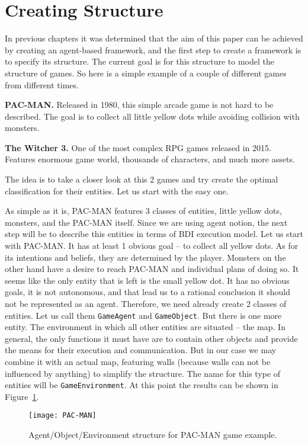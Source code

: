 \section{Creating Structure}
In previous chapters it was determined that the aim of this paper can be achieved by creating an agent-based framework, and the first step to create a framework is to specify its structure. The current goal is for this structure to model the structure of games. So here is a simple example of a couple of different games from different times.
\par
\textbf{PAC-MAN.} Released in 1980, this simple arcade game is not hard to be described.
The goal is to collect all little yellow dots while avoiding collision with monsters.
\par
\textbf{The Witcher 3.} One of the most complex RPG games released in 2015. Features enormous game world, thousands of characters, and much more assets.
\par
The idea is to take a closer look at this 2 games and try create the optimal classification for their entities. Let us start with the easy one.\par
As simple as it is, PAC-MAN features 3 classes of entities, little yellow dots, monsters, and the PAC-MAN itself. Since we are using agent notion, the next step will be to describe this entities in terms of BDI execution model. Let us start with PAC-MAN. It has at least 1 obvious goal -- to collect all yellow dots. As for its intentions and beliefs, they are determined by the player. Monsters on the other hand have a desire to reach PAC-MAN and individual plans of doing so. It seems like the only entity that is left is the small yellow dot. It has no obvious goals, it is not autonomous, and that lead us to a rational conclusion it should not be represented as an agent. Therefore, we need already create 2 classes of entities. Let us call them \texttt{GameAgent} and \texttt{GameObject}. But there is one more entity. The environment in which all other entities are situated -- the map. In general, the only functions it must have are to contain other objects and provide the means for their execution and communication. But in our case we may combine it with an actual map, featuring walls (because walls can not be influenced by anything) to simplify the structure. The name for this type of entities will be \texttt{GameEnvironment}. At this point the results can be shown in Figure~\ref{PacMan}. \par
 \begin{figure}[h!]
    \begin{center}
      \texttt{[image: PAC-MAN]}
      \caption{Agent/Object/Environment structure for PAC-MAN game example.}
      \label{PacMan}
     \end{center}
    \end{figure}
